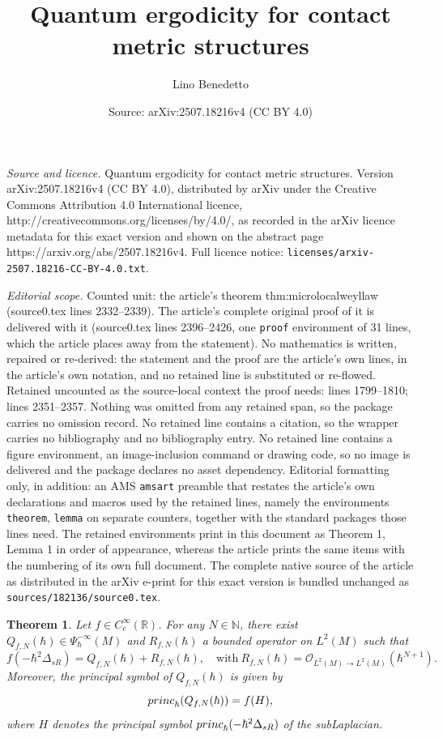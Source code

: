 \documentclass[10pt,a4paper]{amsart}
\title{Quantum ergodicity for contact metric structures}
\author{Lino Benedetto}
\date{Source: arXiv:2507.18216v4 (CC BY 4.0)}
\newtheorem{theorem}{Theorem}
\def\N{{\mathbb N}}%
\def \O{\mathscr{O}}
\def\R{{\mathbb R}}%
\def \princ{{\rm princ}_{\hbar}}
\begin{document}
\maketitle

\noindent\emph{Source and licence.} Quantum ergodicity for contact metric structures. Version arXiv:2507.18216v4 (CC BY 4.0), distributed by arXiv under the Creative Commons Attribution 4.0 International licence, http://creativecommons.org/licenses/by/4.0/, as recorded in the arXiv licence metadata for this exact version and shown on the abstract page https://arxiv.org/abs/2507.18216v4. Full licence notice: \texttt{licenses/arxiv-2507.18216-CC-BY-4.0.txt}.\par\smallskip

\noindent\textit{Editorial scope.} Counted unit: the article's theorem thm:microlocalweyllaw (source0.tex lines 2332--2339). The article's complete original proof of it is delivered with it (source0.tex lines 2396--2426, one \texttt{proof} environment of 31 lines, which the article places away from the statement). No mathematics is written, repaired or re-derived: the statement and the proof are the article's own lines, in the article's own notation, and no retained line is substituted or re-flowed.  Retained uncounted as the source-local context the proof needs: lines 1799--1810; lines 2351--2357.  Nothing was omitted from any retained span, so the package carries no omission record.  No retained line contains a citation, so the wrapper carries no bibliography and no bibliography entry.  No retained line contains a figure environment, an image-inclusion command or drawing code, so no image is delivered and the package declares no asset dependency.  Editorial formatting only, in addition: an AMS \texttt{amsart} preamble that restates the article's own declarations and macros used by the retained lines, namely the environments \texttt{theorem}, \texttt{lemma} on separate counters, together with the standard packages those lines need.  The retained environments print in this document as Theorem 1, Lemma 1 in order of appearance, whereas the article prints the same items with the numbering of its own full document.  The complete native source of the article as distributed in the arXiv e-print for this exact version is bundled unchanged as \texttt{sources/182136/source0.tex}.
\begin{theorem}
    \label{thm:functionalcalc}
    Let $f\in C_c^\infty(\R)$. For any $N\in \N$, there exist $Q_{f,N}(\hbar)\in \Psi_\hbar^{-\infty}(M)$ and $R_{f,N}(\hbar)$ a bounded operator on $L^2(M)$ such that
    \begin{equation*}
        f(-\hbar^2\Delta_{sR}) = Q_{f,N}(\hbar) + R_{f,N}(\hbar),\quad\mbox{with}\ R_{f,N}(\hbar) = \O_{L^2(M)\rightarrow L^2(M)}(\hbar^{N+1}).
    \end{equation*}
    Moreover, the principal symbol of $Q_{f,N}(\hbar)$ is given by
    \begin{equation*}
        \princ(Q_{f,N}(\hbar)) = f(H),
    \end{equation*}
    where $H$ denotes the principal symbol $\princ(-\hbar^2\Delta_{sR})$ of the subLaplacian.
\end{theorem}
\end{document}
